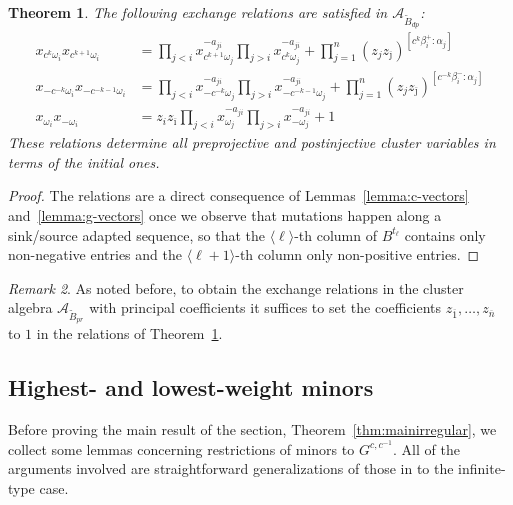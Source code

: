 \documentclass[12pt]{amsart}
\newcommand{\cA}{\mathcal{A}}
\renewcommand{\mod}[1]{\langle {#1} \rangle}
\newcommand{\ol}[1]{\overline{#1}}
\newcommand{\Bpr}{\widetilde{B}_{pr}}
\newcommand{\Bdp}{\widetilde{B}_{dp}}
\newcommand{\Zidx}{\ell}
\newcommand{\cvar}{z}
\newtheorem{theorem}{Theorem}[section]
\theoremstyle{remark}
\newtheorem{remark}[theorem]{Remark}
\numberwithin{equation}{section}
\numberwithin{figure}{section}
\begin{document}
\begin{theorem}
  \label{thm:vars_and_rels_in_bipartite_belt}
  The following exchange relations are satisfied in $\cA_{\Bdp}$:
  \begin{align}
    x_{c^k\omega_i}x_{c^{k+1}\omega_i}
    &=
    \prod_{j<i} x_{c^{k+1}\omega_j}^{-a_{ji}}
    \prod_{j>i} x_{c^k\omega_j}^{-a_{ji}}
    +
    \prod_{j=1}^n (z_j z_{\ol{\jmath}})^{[c^k\beta_i^+:\alpha_j]}
    \label{eq:preprojective}
    \\
    x_{-c^{-k}\omega_i}x_{-c^{-k-1}\omega_i}
    &=
    \prod_{j<i} x_{-c^{-k}\omega_j}^{-a_{ji}}
    \prod_{j>i} x_{-c^{-k-1}\omega_j}^{-a_{ji}}
    +
    \prod_{j=1}^n (z_j z_{\ol{\jmath}})^{[c^{-k}\beta_i^-:\alpha_j]}
    \label{eq:postinjective}
    \\
    x_{\omega_i}x_{-\omega_i}
    &=
    z_iz_{\ol{\imath}}
    \prod_{j<i} x_{\omega_j}^{-a_{ji}}
    \prod_{j>i} x_{-\omega_j}^{-a_{ji}}
    +
    1\label{eq:plusminus}
  \end{align}
  These relations determine all preprojective and postinjective cluster variables in terms of the initial ones.
\end{theorem}
\begin{proof}
  The relations are a direct consequence of Lemmas~\ref{lemma:c-vectors} and~\ref{lemma:g-vectors} once we observe that mutations happen along a sink/source adapted sequence, so that the $\mod{\Zidx}$-th column of $B^{t_\Zidx}$ contains only non-negative entries and the $\mod{\Zidx+1}$-th column only non-positive entries.
\end{proof}
\begin{remark}
  As noted before, to obtain the exchange relations in the cluster algebra $\cA_{\Bpr}$ with principal coefficients it suffices to set the coefficients $\cvar_{\ol{1}},\dotsc,\cvar_{\ol{n}}$ to $1$ in the relations of Theorem~\ref{thm:vars_and_rels_in_bipartite_belt}.
\end{remark}

\subsection{Highest- and lowest-weight minors}
\label{sec:hlwminors}

Before proving the main result of the section, Theorem~\ref{thm:mainirregular}, we collect some lemmas concerning restrictions of minors to $G^{c,c^{-1}}$.
All of the arguments involved are straightforward generalizations of those in \cite{YZ08} to the infinite-type case.
\end{document}
